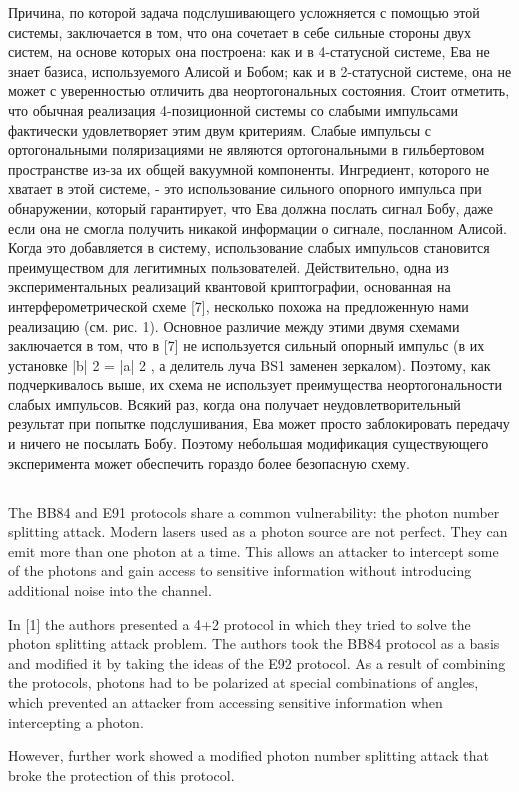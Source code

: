 Причина, по которой задача подслушивающего усложняется с помощью этой системы, заключается в том, что она сочетает в себе сильные стороны двух систем, на основе которых она построена: как и в 4-статусной системе, Ева не знает базиса, используемого Алисой и Бобом; как и в 2-статусной системе, она не может с уверенностью отличить два неортогональных состояния. Стоит отметить, что обычная реализация 4-позиционной системы со слабыми импульсами фактически удовлетворяет этим двум критериям. Слабые импульсы с ортогональными поляризациями не являются ортогональными в гильбертовом пространстве из-за их общей вакуумной компоненты. Ингредиент, которого не хватает в этой системе, - это использование сильного опорного импульса при обнаружении, который гарантирует, что Ева должна послать сигнал Бобу, даже если она не смогла получить никакой информации о сигнале, посланном Алисой. Когда это добавляется в систему, использование слабых импульсов становится преимуществом для легитимных пользователей. Действительно, одна из экспериментальных реализаций квантовой криптографии, основанная на интерферометрической схеме [7], несколько похожа на предложенную нами реализацию (см. рис. 1). Основное различие между этими двумя схемами заключается в том, что в [7] не используется сильный опорный импульс (в их установке |b| 2 = |a| 2 , а делитель луча BS1 заменен зеркалом). Поэтому, как подчеркивалось выше, их схема не использует преимущества неортогональности слабых импульсов. Всякий раз, когда она получает неудовлетворительный результат при попытке подслушивания, Ева может просто заблокировать передачу и ничего не посылать Бобу. Поэтому небольшая модификация существующего эксперимента может обеспечить гораздо более безопасную схему.

\subsection{\review}

The BB84 and E91 protocols share a common vulnerability: the photon number splitting attack. Modern lasers used as a photon source are not perfect. They can emit more than one photon at a time. This allows an attacker to intercept some of the photons and gain access to sensitive information without introducing additional noise into the channel.

In [1] the authors presented a 4+2 protocol in which they tried to solve the photon splitting attack problem. The authors took the BB84 protocol as a basis and modified it by taking the ideas of the E92 protocol. As a result of combining the protocols, photons had to be polarized at special combinations of angles, which prevented an attacker from accessing sensitive information when intercepting a photon.

However, further work showed a modified photon number splitting attack that broke the protection of this protocol.

\subsection{\dic}


